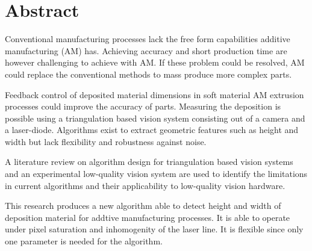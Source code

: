 {}

\chapter*{Abstract}

Conventional manufacturing processes lack the free form capabilities additive manufacturing (AM) has. Achieving accuracy and short production time are however challenging to achieve with AM. If these problem could be resolved, AM could replace the conventional methods to mass produce more complex parts.

Feedback control of deposited material dimensions in soft material AM extrusion processes could improve the accuracy of parts. Measuring the deposition is possible using a triangulation based vision system consisting out of a camera and a laser-diode. Algorithms exist to extract geometric features such as height and width but lack flexibility and robustness against noise. 

A literature review on algorithm design for triangulation based vision systems and an experimental low-quality vision system are used to identify the limitations in current algorithms and their applicability to low-quality vision hardware.
 
This research produces a new algorithm able to detect height and width of deposition material for addtive manufacturing processes. It is able to operate under pixel saturation and inhomogenity of the laser line.  It is flexible since only one parameter is needed for the algorithm.


\cleardoublepage
